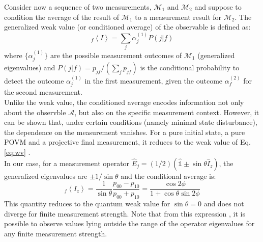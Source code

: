 \documentclass[12pt]{article}
\begin{document}
Consider now a sequence of two measurements, $\mathcal{M}_1$ and $\mathcal{M}_2$ and suppose to condition the average of the result of  $\mathcal{M}_1$ to a measurement result for $\mathcal{M}_2$. The generalized weak value (or conditioned average) of the observable is defined as:
\begin{equation}
 _f \left \langle I \right \rangle = \sum_j \alpha_j^{(1)} P(j|f)
\end{equation}
where $\lbrace \alpha_j^{(1)}\rbrace$ are the possible measurement outcomes of $\mathcal{M}_1$ (generalized eigenvalues) and $P(j|f) = p_{jf}/(\sum_j p_{jf})$ is the conditional probability to detect the outcome $\alpha_j^{(1)}$ in the first measurement, given the outcome $\alpha_f^{(2)}$ for the second measurement.\\
Unlike the weak value, the conditioned average encodes information not only about the observble $\mathcal{A}$, but also on the specific measurement context. However, it can be shown \cite{dressel2010} that, under certain conditions (namely minimal state disturbance), the dependence on the measurement vanishes. For a pure initial state, a pure POVM and a projective final measurement, it reduces to the weak value of Eq. \ref{eq:wv} .\\
In our case, for a measurement operator $\hat{E}_j = (1/2) (\mathbb{\hat{1}} \pm \sin\theta \hat{I}_z)$, the generalized eigenvalues are $\pm 1/\sin\theta$ and the conditional average is:
\begin{equation}
\label{eq:cond_avg}
 _f \left \langle I_z \right \rangle = \frac{1}{\sin\theta} \frac{p_{00}-p_{10}}{p_{00}+p_{10}}  = \frac{\cos 2\phi}{1+ \cos \theta \sin 2\phi}
\end{equation}
This quantity reduces to the quantum weak value for $\sin\theta = 0$ and does not diverge for finite measurement strength. Note that from this expression \cite{williams2008, groen}, it is possible to observe values lying outside the range of the operator eigenvalues for any finite measurement strength.
\\
\end{document}
